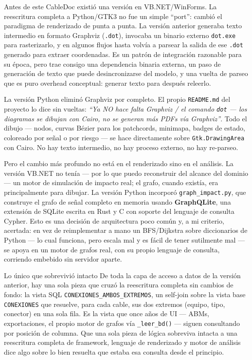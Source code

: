 \documentclass[11pt,twocolumn]{article}
\begin{document}
Antes de este CableDoc existió una versión en VB.NET/WinForms. La reescritura completa a Python/GTK3 no fue un simple ``port'': cambió el paradigma de renderizado de punta a punta. La versión anterior generaba texto intermedio en formato Graphviz (\texttt{.dot}), invocaba un binario externo \texttt{dot.exe} para rasterizarlo, y en algunos flujos hasta volvía a parsear la salida de ese \texttt{.dot} generado para extraer coordenadas. Es un patrón de integración razonable para su época, pero trae consigo una dependencia binaria externa, un paso de generación de texto que puede desincronizarse del modelo, y una vuelta de parseo que es puro overhead conceptual: generar texto para después releerlo.

La versión Python eliminó Graphviz por completo. El propio \texttt{README.md} del proyecto lo dice sin vueltas: \emph{``Ya NO hace falta Graphviz / el comando \texttt{dot} --- los diagramas se dibujan con Cairo, no se generan más PDFs vía Graphviz''}. Todo el dibujo --- nodos, curvas Bézier para los patchcords, minimapa, badges de estado, coloreado por señal o por riesgo --- se hace directamente sobre \texttt{Gtk.DrawingArea} con Cairo. No hay texto intermedio, no hay proceso externo, no hay re-parseo.

Pero el cambio más profundo no está en el renderizado sino en el análisis. La versión VB.NET no tenía --- por lo que puedo reconstruir del alcance del dominio --- un motor de simulación de impacto real; el grafo, cuando existía, era principalmente para dibujar. La versión Python incorporó \texttt{graph\_impact.py}, que construye el grafo de señal completo en memoria usando \textbf{GraphQLite}, una extensión de SQLite escrita en Rust y C con soporte del lenguaje de consulta Cypher. Esto es una decisión de arquitectura poco común y, a mi criterio, acertada: en vez de reimplementar a mano un BFS/Dijkstra sobre diccionarios de Python --- lo cual funciona, pero escala mal y es fácil de tener sutilmente mal --- se apoya en un motor de grafos real, con su propio lenguaje de consulta, corriendo embebido sin servidor aparte.

\begin{bugbox}{Lo único que sobrevivió intacto}
De toda la capa de acceso a datos de la versión anterior, hay una sola pieza que cruzó la reescritura completa sin cambios de fondo: la vista SQL \texttt{CONEXIONES\_AMBOS\_EXTREMOS}, un self-join sobre la vista base \texttt{CONEXIONES} que resuelve, para cada cable, sus dos extremos (equipo, tipo, conector) en una sola fila. Es la vista que once años de UI --- ABMs, exportaciones, el propio motor de grafos vía \texttt{\_leer\_bd()} --- siguen consultando por posición de columna. Que una sola pieza de lógica sobreviva intacta a una reescritura completa de framework, lenguaje de renderizado y motor de análisis dice algo sobre lo bien resuelta que estaba esa consulta desde el principio.
\end{bugbox}
\end{document}
